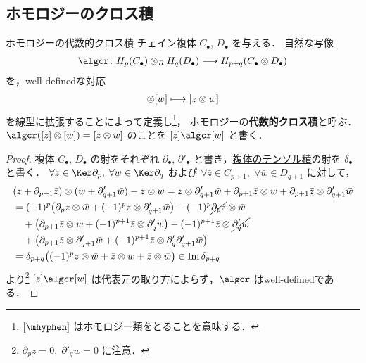 \documentclass[algtopo_main]{subfiles}
\begin{document}
\subsection{ホモロジーのクロス積}

\begin{mydef}[label=def:algcr-homology]{ホモロジーの代数的クロス積}
    チェイン複体 $C_\bullet,\, D_\bullet$ を与える．
    自然な写像
    \begin{align}
        \algcr \colon H_p(C_\bullet) \otimes_R H_q(D_\bullet) \lto H_{p+q} (C_\bullet \otimes D_\bullet)
    \end{align}
    を，well-definedな対応
    \begin{align}
        [z] \otimes [w] \lmto [z \otimes w]
    \end{align}
    を線型に拡張することによって定義し\footnote{$[\mhyphen]$ はホモロジー類をとることを意味する．}，
    ホモロジーの\textbf{代数的クロス積}と呼ぶ．$\algcr ([z] \otimes [w]) = [z \otimes w]$ のことを $[z] \algcr [w]$ と書く．
\end{mydef}

\begin{proof}
    複体 $C_\bullet,\, D_\bullet$ の射をそれぞれ $\partial_\bullet,\, \partial'_\bullet$ と書き，\hyperref[def:tensor-complex]{複体のテンソル積}の射を $\delta_\bullet$ と書く．
    $\forall z \in \Ker \partial_p,\; \forall w \in \Ker \partial_q$ および $\forall \bar{z} \in C_{p+1},\; \forall \bar{w} \in D_{q+1}$ に対して，
    \begin{align}
        &(z + \partial_{p+1} \bar{z}) \otimes (w + \partial'_{q+1} \bar{w}) - z \otimes w
        = z \otimes \partial_{q+1}' \bar{w} + \partial_{p+1} \bar{z} \otimes w + \partial_{p+1} \bar{z} \otimes \partial'_{q+1} \bar{w} \\
        &= (-1)^p \bigl(\partial_p z \otimes \bar{w} + (-1)^p z \otimes \partial_{q+1}' \bar{w} \bigr) - (-1)^{p}\cancel{ \partial_p z} \otimes \bar{w}\\
        &\quad +  \bigl(\partial_{p+1} \bar{z} \otimes w + (-1)^{p+1} \bar{z} \otimes \partial_{q}' w \bigr) - (-1)^{p+1} \bar{z} \otimes \cancel{\partial_{q}' w}\\
        &\quad +  \bigl(\partial_{p+1} \bar{z} \otimes \partial_{q+1}' \bar{w} + (-1)^{p+1} \bar{z} \otimes \partial'_q \partial_{q+1}' \bar{w} \bigr) \\
        &= \delta_{p+q} \bigl( (-1)^p z \otimes \bar{w} + \bar{z} \otimes w + \bar{z} \otimes \bar{w} \bigr) \in \Im \delta_{p+q}
    \end{align}
    より\footnote{$\partial_p z = 0,\; \partial'_q w = 0$ に注意．} $[z] \algcr [w]$ は代表元の取り方によらず，$\algcr$ はwell-definedである．
\end{proof}
\end{document}
